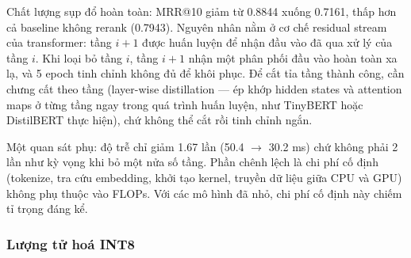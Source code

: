 \documentclass[../DoAn.tex]{subfiles}
\begin{document}
\begin{table}[H]
    \centering
    \caption{Cắt tỉa tầng: L12 so với L6 trên pruned H384}
    \label{tab:layer-pruning}
    {\small
    \setlength{\tabcolsep}{4pt}
    }
\end{table}

Chất lượng sụp đổ hoàn toàn: MRR@10 giảm từ 0.8844 xuống 0.7161, thấp hơn cả baseline không rerank (0.7943). Nguyên nhân nằm ở cơ chế residual stream của transformer: tầng $i+1$ được huấn luyện để nhận đầu vào đã qua xử lý của tầng $i$. Khi loại bỏ tầng $i$, tầng $i+1$ nhận một phân phối đầu vào hoàn toàn xa lạ, và 5 epoch tinh chỉnh không đủ để khôi phục. Để cắt tỉa tầng thành công, cần chưng cất theo tầng (layer-wise distillation --- ép khớp hidden states và attention maps ở từng tầng ngay trong quá trình huấn luyện, như TinyBERT hoặc DistilBERT thực hiện), chứ không thể cắt rồi tinh chỉnh ngắn.

Một quan sát phụ: độ trễ chỉ giảm 1.67 lần (50.4 $\to$ 30.2 ms) chứ không phải 2 lần như kỳ vọng khi bỏ một nửa số tầng. Phần chênh lệch là chi phí cố định (tokenize, tra cứu embedding, khởi tạo kernel, truyền dữ liệu giữa CPU và GPU) không phụ thuộc vào FLOPs. Với các mô hình đã nhỏ, chi phí cố định này chiếm tỉ trọng đáng kể.

\subsubsection{Lượng tử hoá INT8}
\end{document}
